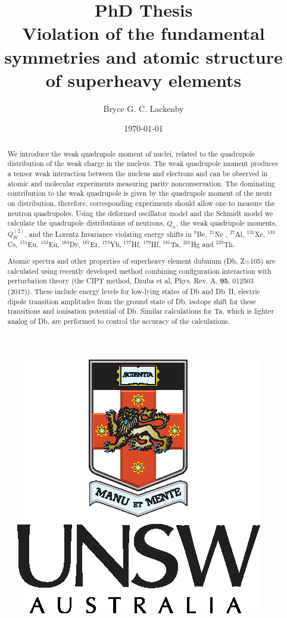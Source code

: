 \documentclass[8pt,a4paper, twoside]{report}
\begin{document}
\onehalfspacing
\title{PhD Thesis \\
Violation of the fundamental symmetries and atomic structure of superheavy elements}
\begin{figure}
\center
\includegraphics[scale=1]{./figures/unsw-crest.eps}
\end{figure}
\author{Bryce G. C. Lackenby}
\date{\today}
\maketitle
\tableofcontents


\begin{abstract}
We introduce the weak quadrupole moment of nuclei, related to the quadrupole distribution of the weak charge in the nucleus.  The weak quadrupole moment produces a tensor weak interaction  between the nucleus and electrons and can be observed in atomic and molecular experiments measuring parity nonconservation. The dominating contribution to the weak quadrupole is given by the quadrupole moment of the neutr on distribution, therefore, corresponding experiments should allow one to measure the neutron quadrupoles. Using the deformed oscillator model and the Schmidt model we calculate the quadrupole distributions of neutrons, $Q_{n}$, the weak quadrupole moments, $Q_{W}^{(2)}$, and the Lorentz Invariance violating energy shifts in $^{9}$Be, $^{21}$Ne , $^{27}$Al, $^{131}$Xe, $^{133}$Cs, $^{151}$Eu, $^{153}$Eu, $^{163}$Dy, $^{167}$Er, $^{173}$Yb, $^{177}$Hf, $^{179}$Hf, $^{181}$Ta, $^{201}$Hg and $^{229}$Th. 

Atomic spectra and other properties of superheavy element dubnium (Db, Z=105) are calculated using
recently developed method combining configuration interaction with perturbation theory (the CIPT method,
Dzuba et al, Phys. Rev. A, {\bf 95}, 012503 (2017)). These include energy levels for low-lying states of Db and Db~II,
electric dipole transition amplitudes from the ground state of Db, isotope shift for these transitions and ionisation 
potential of Db. Similar calculations for Ta, which is lighter analog of Db, are performed to control the accuracy
of the calculations.
\end{abstract}
\end{document}
